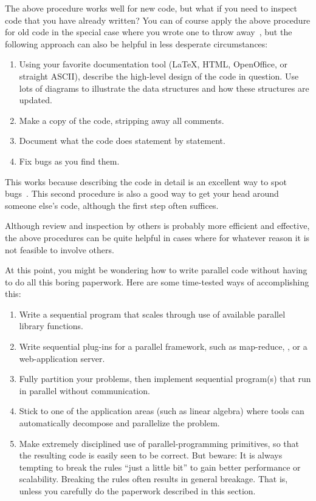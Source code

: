 The above procedure works well for new code, but what if you need to
inspect code that you have already written?
You can of course apply the above procedure for old code in the special
case where you wrote one to throw away~\cite{Brooks79},
but the following approach can also be helpful in less desperate
circumstances:

\begin{enumerate}
\item	Using your favorite documentation tool (\LaTeX{}, HTML,
	OpenOffice, or straight ASCII), describe the high-level
	design of the code in question.
	Use lots of diagrams to illustrate the data structures
	and how these structures are updated.
\item	Make a copy of the code, stripping away all comments.
\item	Document what the code does statement by statement.
\item	Fix bugs as you find them.
\end{enumerate}

This works because describing the code in detail is an excellent way to spot
bugs~\cite{GlenfordJMyers1979}.
This second procedure is also a good way to get your head around
someone else's code, although the first step often suffices.

Although review and inspection by others is probably more efficient and
effective, the above procedures can be quite helpful in cases where
for whatever reason it is not feasible to involve others.

At this point, you might be wondering how to write parallel code without
having to do all this boring paperwork.
Here are some time-tested ways of accomplishing this:

\begin{enumerate}
\item	Write a sequential program that scales through use of
	available parallel library functions.
\item	Write sequential plug-ins for a parallel framework,
	such as map-reduce, , or a web-application server.
\item	Fully partition your problems, then implement sequential
	program(s) that run in parallel without communication.
\item	Stick to one of the application areas (such as linear algebra)
	where tools can automatically decompose and parallelize
	the problem.
\item	Make extremely disciplined use of parallel-programming
	primitives, so that the resulting code is easily seen to be correct.
	But beware: It is always tempting to break the rules
	``just a little bit'' to gain better performance or
	scalability.
	Breaking the rules often results in general breakage.
	That is, unless you carefully do the paperwork described in this
	section.
\end{enumerate}

